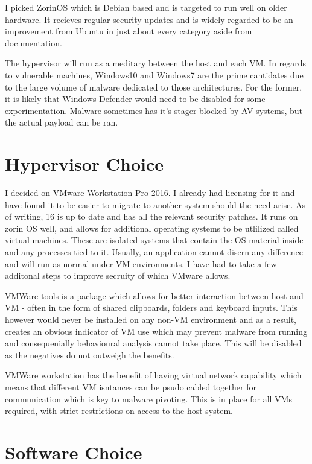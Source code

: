 I picked ZorinOS which is Debian based and is targeted to run well on older hardware. It recieves regular security updates and is widely regarded to be an improvement from Ubuntu in just about every category aside from documentation.

The hypervisor will run as a meditary between the host and each VM. In regards to vulnerable machines, Windows10 and Windows7 are the prime cantidates due to the large volume of malware dedicated to those architectures. For the former, it is likely that Windows Defender would need to be disabled for some experimentation. Malware sometimes has it's stager blocked by AV systems, but the actual payload can be ran.

\section{Hypervisor Choice}
I decided on VMware Workstation Pro 2016. I already had licensing for it and have found it to be easier to migrate to another system should the need arise. As of writing, 16 is up to date and has all the relevant security patches. It runs on zorin OS well, and allows for additional operating systems to be utlilized called virtual machines.
These are isolated systems that contain the OS material inside and any processes tied to it. Usually, an application cannot disern any difference and will run as normal under VM environments. I have had to take a few additonal steps to improve secruity of which VMware allows.

VMWare tools is a package which allows for better interaction between host and VM - often in the form of shared clipboards, folders and keyboard inputs. This however would never be installed on any non-VM environment and as a result, creates an obvious indicator of VM use which may prevent malware from running and consequenially behavioural analysis cannot take place. This will be disabled as the negatives do not outweigh the benefits.

VMWare workstation has the benefit of having virtual network capability which means that different VM isntances can be psudo cabled together for communication which is key to malware pivoting. This is in place for all VMs required, with strict restrictions on access to the host system.


\section{Software Choice}
